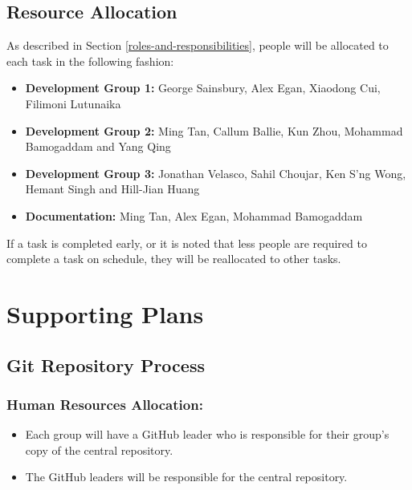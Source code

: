 \documentclass{article}
\begin{document}
\subsection{Resource Allocation}

As described in Section \ref{roles-and-responsibilities}, people will be allocated to each task in the following fashion:

\begin{itemize}
	
\item \textbf{Development Group 1:} George Sainsbury, Alex Egan, Xiaodong Cui, Filimoni Lutunaika \\

\item \textbf{Development Group 2:} Ming Tan, Callum Ballie, Kun Zhou, Mohammad Bamogaddam and Yang Qing\\

\item \textbf{Development Group 3:} Jonathan Velasco, Sahil Choujar, Ken S'ng Wong, Hemant Singh and Hill-Jian Huang\\

\item \textbf{Documentation:} Ming Tan, Alex Egan, Mohammad Bamogaddam\\

\end{itemize}

If a task is completed early, or it is noted that less people are required to complete a task on schedule, they will be reallocated to other tasks.\\

\section{Supporting Plans}

\subsection{Git Repository Process}

\subsubsection{Human Resources Allocation:}
\begin{itemize}	
\item Each group will have a GitHub leader who is responsible for their group's copy of the central repository.
\item The GitHub leaders will be responsible for the central repository.
\end{itemize}
\end{document}
